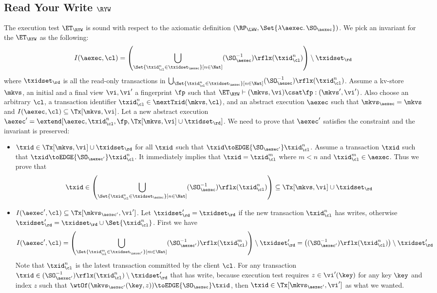 \subsection{Read Your Write \( \RYW \) }

\label{sec:sound-complete-ryw}

The execution test $\ET_\RYW$ is sound with respect to the axiomatic definition 
$(\RP_{\LWW}, \Set{\lambda \aexec \ldotp \SO_{\aexec} })$.
We pick an invariant for the \( \ET_\RYW \) as the following:
\[
    I(\aexec, \cl) = \left( \bigcup_{\Set{\txid_{\cl}^{n} \in \txidset_{\aexec} }[ n \in \Nat ]} (\SO_{\aexec}^{-1})\rflx(\txid^n_\cl) \right) \setminus \txidset_\rd
\]
where \( \txidset_\rd \) is all the read-only transactions in \( \bigcup_{\Set{\txid_{\cl}^{n} \in \txidset_{\aexec} }[ n \in \Nat ]} (\SO_{\aexec}^{-1})\rflx(\txid^n_\cl) \).
Assume a kv-store $\mkvs$, an initial and a final view $\vi, \vi'$  a fingerprint $\fp$ 
such that $\ET_{\RYW} \vdash (\mkvs, \vi) \csat \fp: (\mkvs',\vi')$. 
Also choose an arbitrary $\cl$, a transaction identifier $\txid_\cl^n \in \nextTxid(\mkvs, \cl)$, 
and an abstract execution $\aexec$ such that $\mkvs_{\aexec} = \mkvs$ and 
\( I(\aexec, \cl) \subseteq \Tx[\mkvs, \vi] \).
Let a new abstract execution \( \aexec' = \extend[\aexec, \txid_\cl^n, \fp, \Tx[\mkvs, \vi] \cup \txidset_\rd] \).
We need to prove that \( \aexec' \) satisfies the constraint and the invariant is preserved:
\begin{itemize}
    \item \( \txid \in \Tx[\mkvs, \vi] \cup \txidset_\rd  \) for all \( \txid \) such that \( \txid \toEDGE{\SO_{\aexec'}} \txid_\cl^n  \). 
    Assume a transaction \( \txid \) such that \( \txid \toEDGE{\SO_{\aexec'}} \txid_\cl^n \).
It immediately implies that \( \txid = \txid_\cl^m\) where \( m < n \) and \( \txid_\cl^m \in \aexec \).
Thus we prove that 
\[ 
    \txid \in \left( \bigcup_{\Set{\txid_{\cl}^{n} \in \txidset_{\aexec} }[ n \in \Nat]} (\SO_{\aexec}^{-1})\rflx(\txid^n_\cl) \right) \subseteq \Tx[\mkvs,\vi] \cup \txidset_\rd
\]
\item \(I(\aexec',\cl) \subseteq \Tx[\mkvs_{\aexec'}, \vi'] \).
Let \( \txidset'_\rd = \txidset_\rd \) if the new transaction \( \txid_\cl^n\) has writes, otherwise \( \txidset'_\rd = \txidset_\rd \cup \Set{\txid_\cl^n}\).
First we have
\[ I(\aexec', \cl) = \left(\bigcup_{\Set{\txid_{\cl}^{m} \in \txidset_{\aexec'} }[ m \in \Nat ]} (\SO_{\aexec'}^{-1})\rflx(\txid^m_\cl) \right) \setminus \txidset'_{\rd} = \left( (\SO_{\aexec'}^{-1})\rflx(\txid^n_\cl) \right) \setminus \txidset'_\rd 
\]
Note that \( \txid^n_\cl \) is the latest transaction committed by the client \( \cl \).
For any transaction \( \txid \in (\SO_{\aexec'}^{-1})\rflx(\txid^n_\cl) \setminus \txidset'_\rd \) that has write,
because execution test requires \( z \in \vi'(\key) \) for any key \( \key \) and index \( z \) such that \( \wtOf( \mkvs_{\aexec'}(\key, z) ) \toEDGE{\SO_\aexec} \txid \),
then \( \txid \in \Tx[\mkvs_{\aexec'}, \vi'] \) as what we wanted.
\end{itemize}

